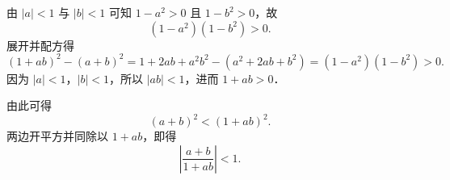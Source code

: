 \begin{myproof}
    由 $|a| < 1$ 与 $|b| < 1$ 可知 $1 - a^2 > 0$ 且 $1 - b^2 > 0$，故
    \begin{equation}
        (1 - a^2)(1 - b^2) > 0.
    \end{equation}
    展开并配方得
    \begin{equation}
        (1 + ab)^2 - (a + b)^2 = 1 + 2ab + a^2 b^2 - (a^2 + 2ab + b^2) = (1 - a^2)(1 - b^2) > 0.
    \end{equation}
    因为 $|a| < 1$，$|b| < 1$，所以 $|ab| < 1$，进而 $1 + ab > 0$．

    由此可得
    \begin{equation}
        (a + b)^2 < (1 + ab)^2.
    \end{equation}
    两边开平方并同除以 $1 + ab$，即得
    \begin{equation}
        \left| \frac{a + b}{1 + ab} \right| < 1.
    \end{equation}
\end{myproof}

\endinput
